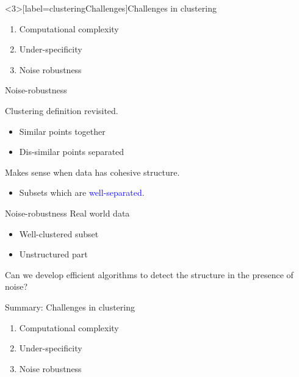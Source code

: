 \documentclass{beamer}
\begin{document}
\begin{frame}<3>[label=clusteringChallenges]{Challenges in clustering}
	\begin{enumerate}
		 \item Computational complexity
		\onslide<2> \vspace{20pt}\item  Under-specificity
		\onslide<3>\vspace{20pt}\item Noise robustness
	\end{enumerate}
\end{frame}

\begin{frame}{Noise-robustness}
	
	Clustering definition revisited.
	\begin{block}{}
		\begin{itemize}
			\item Similar points together
			\item Dis-similar points separated
		\end{itemize}
	\end{block}
	
	\vspace{30pt}Makes sense when data has cohesive structure.
	\begin{itemize}
		\vspace{10pt}\item Subsets which are \textcolor{blue}{well-separated}.
	\end{itemize}
\end{frame}

\begin{frame}{Noise-robustness}
	Real world data
	\begin{itemize}
		\vspace{10pt}\item Well-clustered subset
		\vspace{5pt}\item Unstructured part
	\end{itemize}
	
	\vspace{25pt}Can we develop \alert{efficient algorithms to detect the structure in the presence of noise}?
\end{frame}

\begin{frame}{Summary: Challenges in clustering}
	\begin{enumerate}
		\item Computational complexity
		\vspace{20pt}\item  Under-specificity
		\vspace{20pt}\item Noise robustness
	\end{enumerate}
\end{frame}
\end{document}
